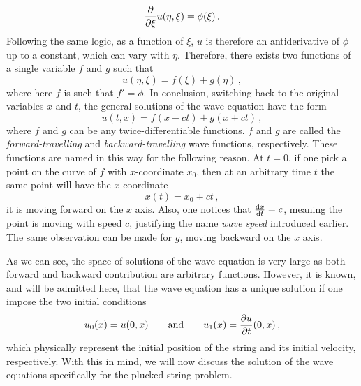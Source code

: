 \begin{equation}
  \frac{\partial }{\partial \xi}u(\eta,\xi)=\phi(\xi)\,.
\end{equation}
Following the same logic, as a function of $\xi$, $u$ is therefore an antiderivative of
$\phi$ up to a constant, which can vary with $\eta$. Therefore, there exists two functions
of a single variable $f$ and $g$ such that
\begin{equation}
  u(\eta,\xi)=f(\xi)+g(\eta)\,,
\end{equation}
where here $f$ is such that $f'=\phi$. In conclusion, switching back to the original
variables $x$ and $t$, the general solutions of the wave equation have the form
\begin{equation}
  \boxed{u(t,x)=f(x-ct)+g(x+ct)\,,}\label{eq:wave-eq-sol}
\end{equation}
where $f$ and $g$ can be any twice-differentiable functions. $f$ and $g$ are called the
\emph{forward-travelling} and \emph{backward-travelling} wave functions, respectively.
These functions are named in this way for the following reason. At $t=0$, if one pick a
point on the curve of $f$ with $x$-coordinate $x_0$, then at an arbitrary time $t$ the
same point will have the $x$-coordinate
\begin{equation}
  x(t)=x_0+ct\,,
\end{equation}
\ie it is moving forward on the $x$ axis. Also, one notices that $\frac{\mathrm{d} x}{\mathrm{d} t}=c$, meaning
the point is moving with speed $c$, justifying the name \emph{wave speed} introduced
earlier. The same observation can be made for $g$, moving backward on the $x$ axis.

As we can see, the space of solutions of the wave equation is very large as both forward
and backward contribution are arbitrary functions. However, it is known, and will be
admitted here, that the wave equation has a unique solution if one impose the two initial
conditions
\begin{equation}
  u_0(x)=u(0,x)\qquad\text{and}\qquad u_1(x)=\frac{\partial u}{\partial t}(0,x)\,,\label{eq:wave-eq-ic}
\end{equation}
which physically represent the initial position of the string and its initial velocity,
respectively. With this in mind, we will now discuss the solution of the wave equations
specifically for the plucked string problem.
%
